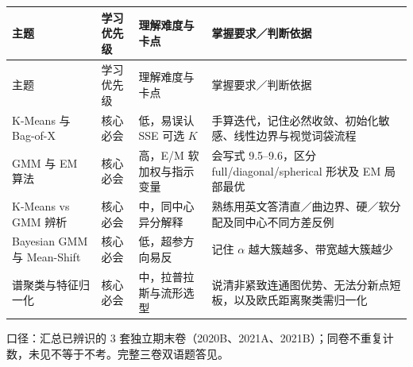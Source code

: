 \begingroup\small\setlength{\tabcolsep}{3pt}\renewcommand{\arraystretch}{1.22}
\begin{longtable}{@{}>{\raggedright\arraybackslash}p{}>{\raggedright\arraybackslash}p{}>{\raggedright\arraybackslash}p{}>{\raggedright\arraybackslash}p{}@{}}
\toprule
主题 & 学习优先级 & 理解难度与卡点 & 掌握要求／判断依据 \\
\midrule\endfirsthead
主题 & 学习优先级 & 理解难度与卡点 & 掌握要求／判断依据 \\
\midrule\endhead
\bottomrule\endfoot
K-Means 与 Bag-of-X & 核心必会 & 低，易误认 SSE 可选 $K$ & 手算迭代，记住必然收敛、初始化敏感、线性边界与视觉词袋流程 \\
GMM 与 EM 算法 & 核心必会 & 高，E/M 软加权与指示变量 & 会写式 9.5–9.6，区分 full/diagonal/spherical 形状及 EM 局部最优 \\
K-Means vs GMM 辨析 & 核心必会 & 中，同中心异分解释 & 熟练用英文答清直／曲边界、硬／软分配及同中心不同方差反例 \\
Bayesian GMM 与 Mean-Shift & 核心必会 & 低，超参方向易反 & 记住 $\alpha$ 越大簇越多、带宽越大簇越少 \\
谱聚类与特征归一化 & 核心必会 & 中，拉普拉斯与流形选型 & 说清非紧致连通图优势、无法分新点短板，以及欧氏距离聚类需归一化 \\
\end{longtable}\endgroup



口径：汇总已辨识的 3 套独立期末卷（2020B、2021A、2021B）；同卷不重复计数，未见不等于不考。完整三卷双语题答见。

